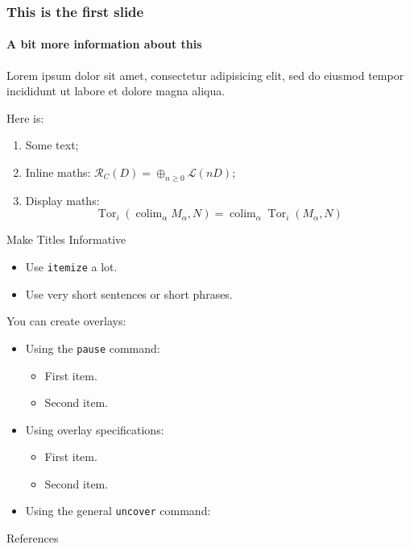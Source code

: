 \documentclass[smaller, aspectratio=169]{beamer}
\title[Paper Presentation]{\paperTitle}
\author{Alireza Heidari}
\institute{Simon Fraser University}
\date[December 2024]{\paperConference, \paperPublishedYear}
\begin{document}
\begin{frame}[plain]
    \titlepage
\end{frame}

\begin{frame}
  \frametitle{This is the first slide}
  \framesubtitle{A bit more information about this}
  
  Lorem ipsum dolor sit amet, consectetur adipisicing elit, sed do eiusmod tempor incididunt ut labore et dolore magna aliqua.
  
  Here is:
  \begin{enumerate}
      \item Some text;
      \item Inline maths: $\mathcal{R}_C(D)=\oplus_{n\geqslant0}\mathcal{L}(nD)$;
      \item Display maths:
      \[
          \operatorname{Tor}_i(\operatorname{colim}_\alpha M_\alpha, N) = \operatorname{colim}_\alpha\operatorname{Tor}_i(M_\alpha, N)
      \]
  \end{enumerate}
\end{frame}


\begin{frame}{Make Titles Informative}
  \begin{itemize}
      \item Use \texttt{itemize} a lot.
      \item Use very short sentences or short phrases.
  \end{itemize}
  You can create overlays:
  \begin{itemize}
      \item Using the \texttt{pause} command:
      \begin{itemize}
          \item First item.
          \pause
          \item Second item.
      \end{itemize}
      \item Using overlay specifications:
      \begin{itemize}
          \item<3-> First item.
          \item<4-> Second item.
      \end{itemize}
      \item Using the general \texttt{uncover} command:
      \begin{itemize}
      \end{itemize}
  \end{itemize}
\end{frame}


\begin{frame}[t]{References}
    \nocite{*}
    \small
    \printbibliography
\end{frame}
\end{document}
